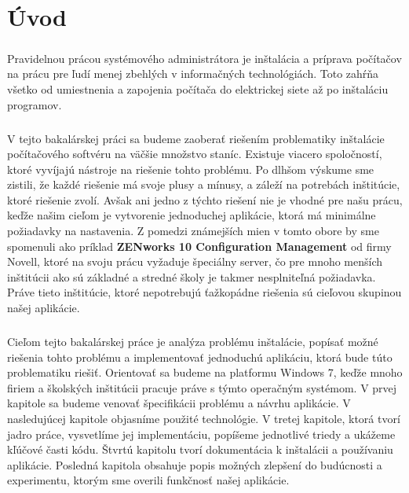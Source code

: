 \chapter*{Úvod}
\paragraph{}
Pravidelnou prácou systémového administrátora je inštalácia a príprava počítačov na prácu pre ľudí menej zbehlých v informačných technológiách. Toto zahŕňa všetko od umiestnenia a zapojenia počítača do elektrickej siete až po inštaláciu programov.

\paragraph{}
V tejto bakalárskej práci sa budeme zaoberať riešením problematiky inštalácie počítačového softvéru na väčšie množstvo staníc. Existuje viacero spoločností, ktoré vyvíjajú nástroje na riešenie tohto problému. Po dlhšom výskume sme zistili, že každé riešenie má svoje plusy a mínusy, a záleží na potrebách inštitúcie, ktoré riešenie zvolí. Avšak ani jedno z týchto riešení nie je vhodné pre našu prácu, keďže našim cieľom je vytvorenie jednoduchej aplikácie, ktorá má minimálne požiadavky na nastavenia. Z pomedzi známejších mien v tomto obore by sme spomenuli ako príklad \textbf{ZENworks 10 Configuration Management} od firmy Novell, ktoré na svoju prácu vyžaduje špeciálny server, čo pre mnoho menších inštitúcii ako sú základné a stredné školy je takmer nesplniteľná požiadavka. Práve tieto inštitúcie, ktoré nepotrebujú ťažkopádne riešenia sú cieľovou skupinou našej aplikácie. 

\paragraph{}
Cieľom tejto bakalárskej práce je analýza problému inštalácie, popísať možné riešenia tohto problému a implementovať jednoduchú aplikáciu, ktorá bude túto problematiku riešiť. Orientovať sa budeme na platformu Windows 7, keďže mnoho firiem a školských inštitúcii pracuje práve s týmto operačným systémom.
V prvej kapitole sa budeme venovať špecifikácii problému a návrhu aplikácie. V nasledujúcej kapitole objasníme použité technológie. V tretej kapitole, ktorá tvorí jadro práce, vysvetlíme jej implementáciu, popíšeme jednotlivé triedy a ukážeme kľúčové časti kódu. Štvrtú kapitolu tvorí dokumentácia k inštalácii a používaniu aplikácie. Posledná kapitola obsahuje popis možných zlepšení do budúcnosti a experimentu, ktorým sme overili funkčnosť našej aplikácie.